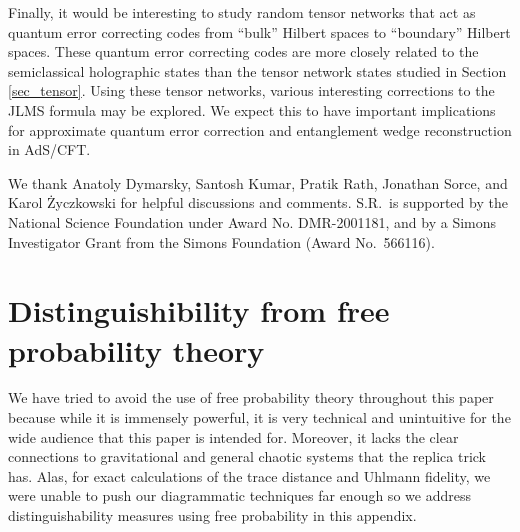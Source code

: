 \documentclass[a4paper,11pt]{article}
\begin{document}
Finally, it would be interesting to study random tensor networks that act as quantum error correcting codes from ``bulk'' Hilbert spaces to ``boundary'' Hilbert spaces. These quantum error correcting codes are more closely related to the semiclassical holographic states than the tensor network states studied in Section \ref{sec_tensor}. Using these tensor networks, various interesting corrections to the JLMS formula \cite{2016JHEP...06..004J} may be explored. We expect this to have important implications for approximate quantum error correction and entanglement wedge reconstruction in AdS/CFT.



\acknowledgments

We thank Anatoly Dymarsky, Santosh Kumar, Pratik Rath, Jonathan Sorce, and Karol \.{Z}yczkowski for helpful discussions and comments. S.R.~is supported
by the National Science Foundation under Award No.
DMR-2001181, and by a Simons Investigator Grant from
the Simons Foundation (Award No.~566116).

\appendix

\section{Distinguishibility from free probability theory}
\label{free_prob_app}

We have tried to avoid the use of free probability theory throughout this paper because while it is immensely powerful, it is very technical and unintuitive for the wide audience that this paper is intended for. Moreover, it lacks the clear connections to gravitational and general chaotic systems that the replica trick has. Alas, for exact calculations of the trace distance and Uhlmann fidelity, we were unable to push our diagrammatic techniques far enough so we address distinguishability measures using free probability in this appendix.
\end{document}
